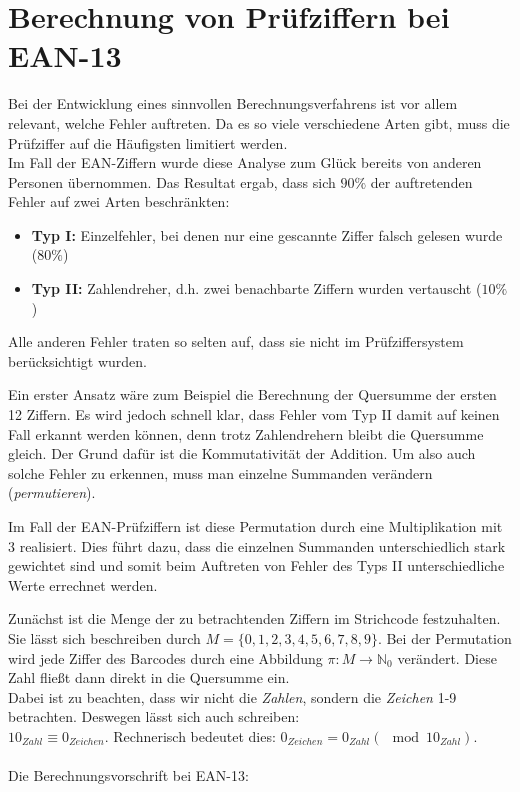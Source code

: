 \documentclass[a4paper,12pt]{article}
\begin{document}
\section{Berechnung von Prüfziffern bei EAN-13}
Bei der Entwicklung eines sinnvollen Berechnungsverfahrens ist vor allem relevant, welche Fehler auftreten. Da es so viele verschiedene Arten gibt, muss die Prüfziffer auf die Häufigsten limitiert werden.\\
Im Fall der EAN-Ziffern wurde diese Analyse zum Glück bereits von anderen Personen übernommen. Das Resultat ergab, dass sich $90\%$ der auftretenden Fehler auf zwei Arten beschränkten:
\begin{itemize}
  \item{\textbf{Typ I:} Einzelfehler, bei denen nur eine gescannte Ziffer falsch gelesen wurde ($80 \%$)}
  \item{\textbf{Typ II:} Zahlendreher, d.h. zwei benachbarte Ziffern wurden vertauscht ($10 \%$)}
\end{itemize}
Alle anderen Fehler traten so selten auf, dass sie nicht im Prüfziffersystem berücksichtigt wurden.

Ein erster Ansatz wäre zum Beispiel die Berechnung der Quersumme der ersten 12 Ziffern. Es wird jedoch schnell klar, dass Fehler vom Typ II damit auf keinen Fall erkannt werden können, denn trotz Zahlendrehern bleibt die Quersumme gleich. Der Grund dafür ist die Kommutativität der Addition. Um also auch solche Fehler zu erkennen, muss man einzelne Summanden verändern (\textit{permutieren}).

Im Fall der EAN-Prüfziffern ist diese Permutation durch eine Multiplikation mit 3 realisiert. Dies führt dazu, dass die einzelnen Summanden unterschiedlich stark gewichtet sind und somit beim Auftreten von Fehler des Typs II unterschiedliche Werte errechnet werden.

Zunächst ist die Menge der zu betrachtenden Ziffern im Strichcode festzuhalten. Sie lässt sich beschreiben durch $M = \{0, 1, 2, 3, 4, 5, 6, 7, 8, 9\}$. Bei der Permutation wird jede Ziffer des Barcodes durch eine Abbildung $\pi : M \rightarrow \mathbb{N}_0$ verändert. Diese Zahl fließt dann direkt in die Quersumme ein.\\
Dabei ist zu beachten, dass wir nicht die \textit{Zahlen}, sondern die \textit{Zeichen} 1-9 betrachten. Deswegen lässt sich auch schreiben:\\
$10_{Zahl} \equiv 0_{Zeichen}$. Rechnerisch bedeutet dies: $0_{Zeichen} = 0_{Zahl} (\mod 10_{Zahl})$.\\\\
Die Berechnungsvorschrift bei EAN-13:
\end{document}
